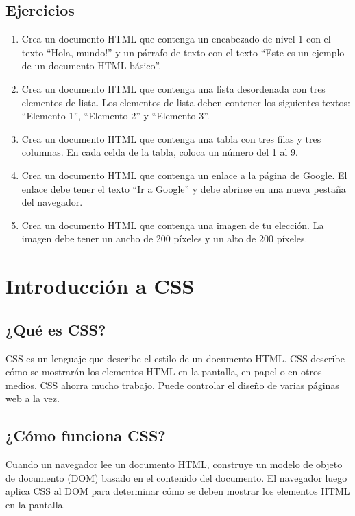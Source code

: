\documentclass[
  a4paper,
  DIV=11,
  numbers=noendperiod,
  onepage,
  openany]{scrreprt}
\begin{document}
\section{Ejercicios}\label{ejercicios}

\begin{enumerate}
\def\labelenumi{\arabic{enumi}.}
\item
  Crea un documento HTML que contenga un encabezado de nivel 1 con el
  texto ``Hola, mundo!'' y un párrafo de texto con el texto ``Este es un
  ejemplo de un documento HTML básico''.
\item
  Crea un documento HTML que contenga una lista desordenada con tres
  elementos de lista. Los elementos de lista deben contener los
  siguientes textos: ``Elemento 1'', ``Elemento 2'' y ``Elemento 3''.
\item
  Crea un documento HTML que contenga una tabla con tres filas y tres
  columnas. En cada celda de la tabla, coloca un número del 1 al 9.
\item
  Crea un documento HTML que contenga un enlace a la página de Google.
  El enlace debe tener el texto ``Ir a Google'' y debe abrirse en una
  nueva pestaña del navegador.
\item
  Crea un documento HTML que contenga una imagen de tu elección. La
  imagen debe tener un ancho de 200 píxeles y un alto de 200 píxeles.
\end{enumerate}

\chapter{Introducción a CSS}\label{introducciuxf3n-a-css}

\section{¿Qué es CSS?}\label{quuxe9-es-css}

CSS es un lenguaje que describe el estilo de un documento HTML. CSS
describe cómo se mostrarán los elementos HTML en la pantalla, en papel o
en otros medios. CSS ahorra mucho trabajo. Puede controlar el diseño de
varias páginas web a la vez.

\section{¿Cómo funciona CSS?}\label{cuxf3mo-funciona-css}

Cuando un navegador lee un documento HTML, construye un modelo de objeto
de documento (DOM) basado en el contenido del documento. El navegador
luego aplica CSS al DOM para determinar cómo se deben mostrar los
elementos HTML en la pantalla.
\end{document}
